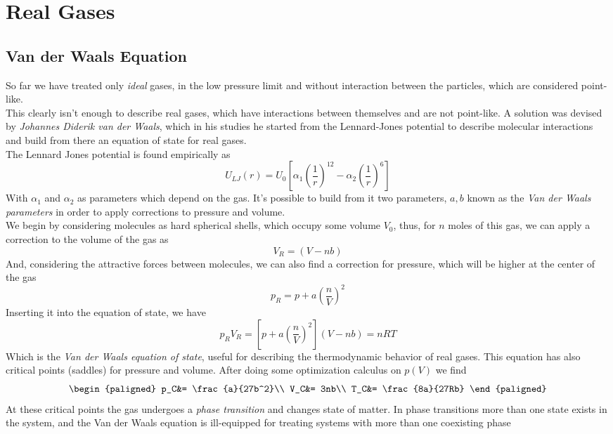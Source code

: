 \documentclass[../qm.tex]{subfiles}
\begin{document}
\section{Real Gases}
\subsection{Van der Waals Equation}
So far we have treated only \textit{ideal} gases, in the low pressure limit and without interaction between the particles, which are considered point-like.\\ 
This clearly isn't enough to describe real gases, which have interactions between themselves and are not point-like. A solution was devised by \textit{Johannes Diderik van der Waals}, which in his studies he started from the Lennard-Jones potential to describe molecular interactions and build from there an equation of state for real gases.\\
The Lennard Jones potential is found empirically as 
\begin{equation}
	U_{LJ}(r)=U_0\left[ \alpha_1\left( \frac{1}{r} \right)^{12}-\alpha_2\left( \frac{1}{r} \right)^6 \right]
	\label{eq:lennardjones.real}
\end{equation}
With $\alpha_1$ and $\alpha_2$ as parameters which depend on the gas. It's possible to build from it two parameters, $a, b$ known as the \textit{Van der Waals parameters} in order to apply corrections to pressure and volume.\\
We begin by considering molecules as hard spherical shells, which occupy some volume $V_0$, thus, for $n$ moles of this gas, we can apply a correction to the volume of the gas as
\begin{equation}
	V_R=\left( V-nb \right)
	\label{eq:realvol.real}
\end{equation}
And, considering the attractive forces between molecules, we can also find a correction for pressure, which will be higher at the center of the gas
\begin{equation}
	p_R=p+a\left( \frac{n}{V} \right)^2
	\label{eq:realp.real}
\end{equation}
Inserting it into the equation of state, we have
\begin{equation}
	p_RV_R=\left[ p+a\left( \frac{n}{V} \right)^2 \right]\left( V-nb \right)=nRT
	\label{eq:vanderwaals.real}
\end{equation}
Which is the \textit{Van der Waals equation of state}, useful for describing the thermodynamic behavior of real gases. This equation has also critical points (saddles) for pressure and volume. After doing some optimization calculus on $p(V)$ we find
\begin{equation}
	\begin{paligned}
		p_C&= \frac{a}{27b^2}\\
		V_C&= 3nb\\
		T_C&= \frac{8a}{27Rb}
	\end{paligned}
	\label{eq:critpoints.real}
\end{equation}
At these critical points the gas undergoes a \textit{phase transition} and changes state of matter. In phase transitions more than one state exists in the system, and the Van der Waals equation is ill-equipped for treating systems with more than one coexisting phase
\end{document}
